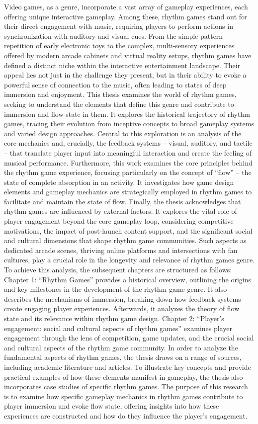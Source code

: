 Video games, as a genre, incorporate a vast array of gameplay experiences, each offering unique interactive gameplay. Among these, rhythm games stand out for their direct engagement with music, requiring players to perform actions in synchronization with auditory and visual cues. From the simple pattern repetition of early electronic toys to the complex, multi-sensory experiences offered by modern arcade cabinets and virtual reality setups, rhythm games have defined a distinct niche within the interactive entertainment landscape. Their appeal lies not just in the challenge they present, but in their ability to evoke a powerful sense of connection to the music, often leading to states of deep immersion and enjoyment.
This thesis examines the world of rhythm games, seeking to understand the elements that define this genre and contribute to immersion and flow state in them. It explores the historical trajectory of rhythm games, tracing their evolution from inceptive concepts to broad gameplay systems and varied design approaches. Central to this exploration is an analysis of the core mechanics and, crucially, the feedback systems -- visual, auditory, and tactile -- that translate player input into meaningful interaction and create the feeling of musical performance.
Furthermore, this work examines the core principles behind the rhythm game experience, focusing particularly on the concept of “flow” -- the state of complete absorption in an activity. It investigates how game design elements and gameplay mechanics are strategically employed in rhythm games to facilitate and maintain the state of flow.
Finally, the thesis acknowledges that rhythm games are influenced by external factors. It explores the vital role of player engagement beyond the core gameplay loop, considering competitive motivations, the impact of post-launch content support, and the significant social and cultural dimensions that shape rhythm game communities. Such aspects as dedicated arcade scenes, thriving online platforms and intersections with fan cultures, play a crucial role in the longevity and relevance of rhythm games genre. 
To achieve this analysis, the subsequent chapters are structured as follows: Chapter 1: “Rhythm Games” provides a historical overview, outlining the origins and key milestones in the development of the rhythm game genre. It also describes the mechanisms of immersion, breaking down how feedback systems create engaging player experiences. Afterwards, it analyzes the theory of flow state and its relevance within rhythm game design. Chapter 2: “Player’s engagement: social and cultural aspects of rhythm games” examines player engagement through the lens of competition, game updates, and the crucial social and cultural aspects of the rhythm game community.
In order to analyze the fundamental aspects of rhythm games, the thesis draws on a range of sources, including academic literature and articles. To illustrate key concepts and provide practical examples of how these elements manifest in gameplay, the thesis also incorporates case studies of specific rhythm games.
The purpose of this research is to examine how specific gameplay mechanics in rhythm games contribute to player immersion and evoke flow state, offering insights into how these experiences are constructed and how do they influence the player’s engagement.